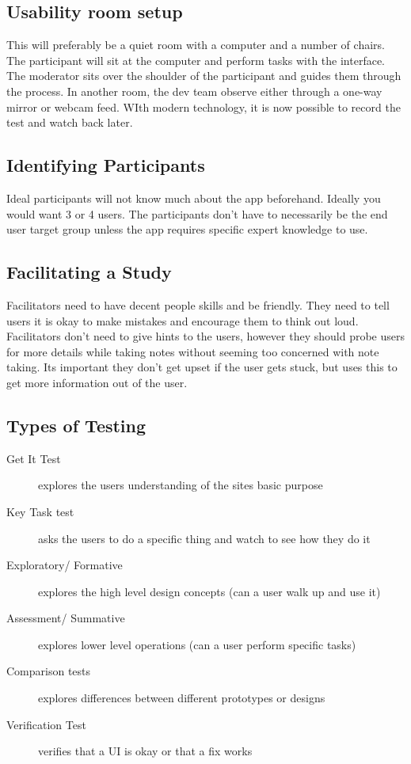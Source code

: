 \subsection{Usability room setup}
This will preferably be a quiet room with a computer and a number of chairs. The participant will sit at the computer and perform tasks with the interface. The moderator sits over the shoulder of the participant and guides them through the process. In another room, the dev team observe either through a one-way mirror or webcam feed. WIth modern technology, it is now possible to record the test and watch back later.

\subsection{Identifying Participants}
Ideal participants will not know much about the app beforehand. Ideally you would want 3 or 4 users. The participants don't have to necessarily be the end user target group unless the app requires specific expert knowledge to use.

\subsection{Facilitating a Study}
Facilitators need to have decent people skills and be friendly. They need to tell users it is okay to make mistakes and encourage them to think out loud. Facilitators don't need to give hints to the users, however they should probe users for more details while taking notes without seeming too concerned with note taking. Its important they don't get upset if the user gets stuck, but uses this to get more information out of the user.

\subsection{Types of Testing}
\begin{description}
    \item[Get It Test] explores the users understanding of the sites basic purpose
    \item[Key Task test] asks the users to do a specific thing and watch to see how they do it
    \item[Exploratory/ Formative] explores the high level design concepts (can a user walk up and use it)
    \item[Assessment/ Summative] explores lower level operations (can a user perform specific tasks)
    \item[Comparison tests] explores differences between different prototypes or designs
    \item[Verification Test] verifies that a UI is okay or that a fix works   
\end{description}

